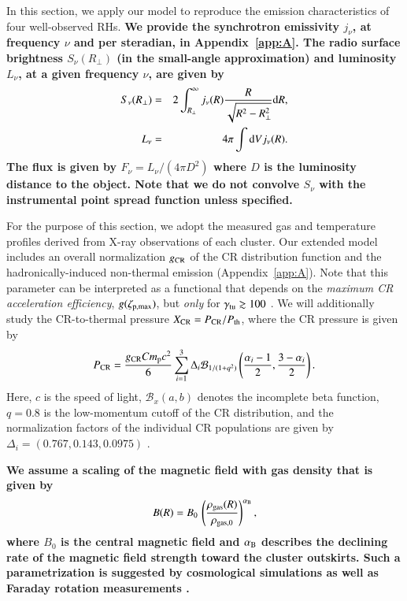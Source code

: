 \documentclass[useAMS,usenatbib]{mn2e}
\newcommand{\dd}{\mathrm{d}}
\begin{document}
In this section, we apply our model to reproduce the emission characteristics of
four well-observed RHs.  {\bf We provide the synchrotron emissivity $j_{\nu}$,
  at frequency $\nu$ and per steradian, in Appendix~\ref{app:A}.  The radio
  surface brightness $S_{\nu}(R_{\perp})$ (in the small-angle approximation) and
  luminosity $L_{\nu}$, at a given frequency $\nu$, are given by
\begin{eqnarray}
S_\nu(R_{\perp}) &=& 2 \int_{R_{\perp}}^{\infty} j_{\nu}(R) \frac{R}{\sqrt{R^{2}-R_{\perp}^{2}}} \rmn{d}R, \label{eq:surf} \\
L_{\nu}  &=&  4 \pi \int \dd V j_\nu(R).
\label{eq:lum}
\end{eqnarray}
The flux is given by $F_{\nu}=L_{\nu}/(4\pi D^{2})$ where $D$ is the luminosity
distance to the object. Note that we do not convolve $S_\nu$ with the instrumental
point spread function unless specified.}

For the purpose of this section, we adopt the measured gas and temperature
profiles derived from X-ray observations of each cluster.  Our extended model
includes an overall normalization $g_{{\mathrm{CR}}}$ of the CR distribution function
and the hadronically-induced non-thermal emission (Appendix~\ref{app:A}). Note
that this parameter can be interpreted as a functional that depends on the
\emph{maximum CR acceleration efficiency}, $g(\zeta_{{\mathrm{p,max}}})$, but
\emph{only} for $\gamma_{{\mathrm{tu}}}\gtrsim100$ \citep{2010MNRAS.409..449P}. We
will additionally study the CR-to-thermal pressure $X_{{\mathrm{CR}}}=
P_{{\mathrm{CR}}}/P_{{\mathrm{th}}}$, where the CR pressure is given by
\begin{equation}
  \label{eq:PCR}
  P_{{\mathrm{CR}}}=\frac{g_{{\mathrm{CR}}} C m_{{\mathrm{p}}} c^{2}}{6}
  \sum_{i=1}^{3} \Delta_{i} \mathcal{B}_{1/(1+q^2)} \left(
    \frac{\alpha_{i}-1}{2},\frac{3-\alpha_{i}}{2} \right).
\end{equation}
Here, $c$ is the speed of light, $\mathcal{B}_x(a,b)$ denotes the incomplete beta
function, $q=0.8$ is the low-momentum cutoff of the CR distribution, and the
normalization factors of the individual CR populations are given by $\Delta_{i}
= (0.767, 0.143, 0.0975)$ \citep[][see also
Appendix~\ref{app:A}]{2010MNRAS.409..449P}.

{\bf We assume a scaling of the magnetic field with gas density that is given by
\begin{equation}
B(R) = B_0\,\left(\frac{\rho_{{\mathrm{gas}}}(R)}{\rho_{{\mathrm{gas}},0}}\right)^{ \alpha_{{\mathrm{B}}}},
\label{eq:B}
\end{equation}
where $B_0$ is the central magnetic field and $\alpha_{{\mathrm{B}}}$ describes the
declining rate of the magnetic field strength toward the cluster outskirts. Such
a parametrization is suggested by cosmological simulations \citep{2008A&A...482L..13D} 
as well as Faraday rotation measurements 
\citep[][and references therein]{2010A&A...513A..30B, 2011A&A...529A..13K}.}
\end{document}
